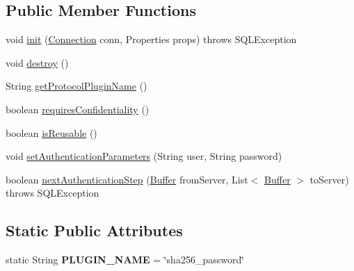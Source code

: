 \subsection*{Public Member Functions}
\begin{DoxyCompactItemize}
\item 
void \mbox{\hyperlink{classcom_1_1mysql_1_1jdbc_1_1authentication_1_1_sha256_password_plugin_afabf8d68fc723bebb401147b2f1a5421}{init}} (\mbox{\hyperlink{interfacecom_1_1mysql_1_1jdbc_1_1_connection}{Connection}} conn, Properties props)  throws S\+Q\+L\+Exception 
\item 
void \mbox{\hyperlink{classcom_1_1mysql_1_1jdbc_1_1authentication_1_1_sha256_password_plugin_a14bf49c27aa9a84172fb866016a9fdf3}{destroy}} ()
\item 
String \mbox{\hyperlink{classcom_1_1mysql_1_1jdbc_1_1authentication_1_1_sha256_password_plugin_a038ab59e32db24d7aba880be1bdf3286}{get\+Protocol\+Plugin\+Name}} ()
\item 
boolean \mbox{\hyperlink{classcom_1_1mysql_1_1jdbc_1_1authentication_1_1_sha256_password_plugin_a4ac61329eb620bd7e2432c5fcb3a40ef}{requires\+Confidentiality}} ()
\item 
boolean \mbox{\hyperlink{classcom_1_1mysql_1_1jdbc_1_1authentication_1_1_sha256_password_plugin_acd2909ff9faf158cd5cd6bf14851dddc}{is\+Reusable}} ()
\item 
void \mbox{\hyperlink{classcom_1_1mysql_1_1jdbc_1_1authentication_1_1_sha256_password_plugin_a2aa9fda4aa70184de8f7407854ed0000}{set\+Authentication\+Parameters}} (String user, String password)
\item 
boolean \mbox{\hyperlink{classcom_1_1mysql_1_1jdbc_1_1authentication_1_1_sha256_password_plugin_aa46e906714a3b8a223f0e3e15e2aaf94}{next\+Authentication\+Step}} (\mbox{\hyperlink{classcom_1_1mysql_1_1jdbc_1_1_buffer}{Buffer}} from\+Server, List$<$ \mbox{\hyperlink{classcom_1_1mysql_1_1jdbc_1_1_buffer}{Buffer}} $>$ to\+Server)  throws S\+Q\+L\+Exception 
\end{DoxyCompactItemize}
\subsection*{Static Public Attributes}
\begin{DoxyCompactItemize}
\item 
\mbox{\label{classcom_1_1mysql_1_1jdbc_1_1authentication_1_1_sha256_password_plugin_afe51409ebff9393e26f2357e3e844a3c}} 
static String {\bfseries P\+L\+U\+G\+I\+N\+\_\+\+N\+A\+ME} = \char`\"{}sha256\+\_\+password\char`\"{}
\end{DoxyCompactItemize}


